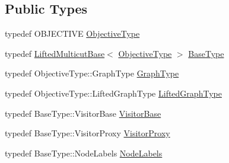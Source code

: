 \subsection*{Public Types}
\begin{DoxyCompactItemize}
\item 
typedef O\+B\+J\+E\+C\+T\+I\+V\+E \hyperlink{classnifty_1_1graph_1_1lifted__multicut_1_1LiftedMulticutAndresKernighanLin_ac7e43ca279b2efcbc2ebef1e7fed5816}{Objective\+Type}
\item 
typedef \hyperlink{classnifty_1_1graph_1_1lifted__multicut_1_1LiftedMulticutBase}{Lifted\+Multicut\+Base}$<$ \hyperlink{classnifty_1_1graph_1_1lifted__multicut_1_1LiftedMulticutAndresKernighanLin_ac7e43ca279b2efcbc2ebef1e7fed5816}{Objective\+Type} $>$ \hyperlink{classnifty_1_1graph_1_1lifted__multicut_1_1LiftedMulticutAndresKernighanLin_a1980265abbe7e1632e7e68ae21dc8350}{Base\+Type}
\item 
typedef Objective\+Type\+::\+Graph\+Type \hyperlink{classnifty_1_1graph_1_1lifted__multicut_1_1LiftedMulticutAndresKernighanLin_ab9df00196671b4579b041f080c40e2c4}{Graph\+Type}
\item 
typedef Objective\+Type\+::\+Lifted\+Graph\+Type \hyperlink{classnifty_1_1graph_1_1lifted__multicut_1_1LiftedMulticutAndresKernighanLin_afc82ef6686af2b8a0e1183fd7378725c}{Lifted\+Graph\+Type}
\item 
typedef Base\+Type\+::\+Visitor\+Base \hyperlink{classnifty_1_1graph_1_1lifted__multicut_1_1LiftedMulticutAndresKernighanLin_ab9331c2df1e0f0271899de4529631965}{Visitor\+Base}
\item 
typedef Base\+Type\+::\+Visitor\+Proxy \hyperlink{classnifty_1_1graph_1_1lifted__multicut_1_1LiftedMulticutAndresKernighanLin_a155c29dba5b4776980bd4599eae348e1}{Visitor\+Proxy}
\item 
typedef Base\+Type\+::\+Node\+Labels \hyperlink{classnifty_1_1graph_1_1lifted__multicut_1_1LiftedMulticutAndresKernighanLin_a03cd7122bcfadca7b44c2ed143355289}{Node\+Labels}
\end{DoxyCompactItemize}

